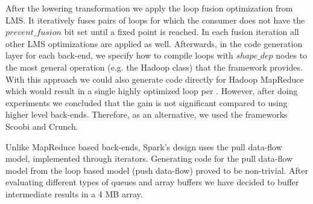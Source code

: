 After the lowering transformation we apply the loop fusion optimization from
LMS. It iteratively fuses pairs of loops for which the consumer does not have
the $prevent\_fusion$ bit set until a fixed point is reached. In each fusion
iteration all other LMS optimizations are applied as well. Afterwards, in the
code generation layer for each back-end, we specify how to compile loops with
$shape\_dep$ nodes to the most general operation (e.g. the Hadoop 
class) that the framework provides. With this approach we could also generate
code directly for Hadoop MapReduce which would result in a single highly
optimized loop per . However, after doing experiments we concluded
that the gain is not significant compared to using higher level back-ends.
Therefore, as an alternative, we used the frameworks Scoobi and Crunch.


Unlike MapReduce based back-ends, Spark's design uses the pull data-flow model,
implemented through iterators. Generating code for the pull data-flow model from
the loop based model (push data-flow) proved to be non-trivial. After evaluating
different types of queues and array buffers we have decided to buffer
intermediate results in a 4 MB array.